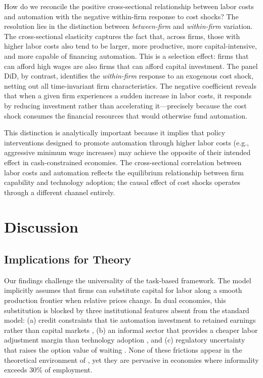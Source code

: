 \documentclass[5p,times,authoryear]{elsarticle}
\begin{document}
How do we reconcile the positive cross-sectional relationship between labor costs and automation with the negative within-firm response to cost shocks? The resolution lies in the distinction between \emph{between-firm} and \emph{within-firm} variation. The cross-sectional elasticity captures the fact that, across firms, those with higher labor costs also tend to be larger, more productive, more capital-intensive, and more capable of financing automation. This is a selection effect: firms that can afford high wages are also firms that can afford capital investment. The panel DiD, by contrast, identifies the \emph{within-firm} response to an exogenous cost shock, netting out all time-invariant firm characteristics. The negative coefficient reveals that when a given firm experiences a sudden increase in labor costs, it responds by reducing investment rather than accelerating it---precisely because the cost shock consumes the financial resources that would otherwise fund automation.

This distinction is analytically important because it implies that policy interventions designed to promote automation through higher labor costs (e.g., aggressive minimum wage increases) may achieve the opposite of their intended effect in cash-constrained economies. The cross-sectional correlation between labor costs and automation reflects the equilibrium relationship between firm capability and technology adoption; the causal effect of cost shocks operates through a different channel entirely.

\FloatBarrier


\section{Discussion}
\label{sec:policy}

\subsection{Implications for Theory}
\label{subsec:theory_implications}

Our findings challenge the universality of the \citet{acemoglu2019automation} task-based framework. The model implicitly assumes that firms can substitute capital for labor along a smooth production frontier when relative prices change. In dual economies, this substitution is blocked by three institutional features absent from the standard model: (a) credit constraints that tie automation investment to retained earnings rather than capital markets \citep{busso2020, hsieh2009misallocation}, (b) an informal sector that provides a cheaper labor adjustment margin than technology adoption \citep{levy2008good, perry2007informality}, and (c) regulatory uncertainty that raises the option value of waiting \citep{prettner2020innovation}. None of these frictions appear in the theoretical environment of \citet{acemoglu2022tasks}, yet they are pervasive in economies where informality exceeds 30\% of employment.
\end{document}
